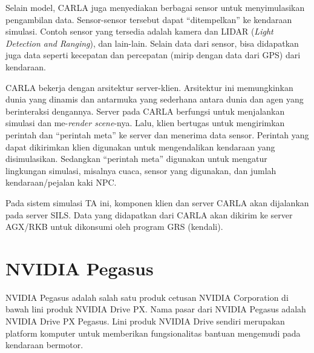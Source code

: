Selain model, CARLA juga menyediakan berbagai sensor untuk menyimulasikan
pengambilan data. Sensor-sensor tersebut dapat ``ditempelkan'' ke kendaraan
simulasi. Contoh sensor yang tersedia adalah kamera dan LIDAR (\textit{Light
    Detection and Ranging}), dan lain-lain. Selain data dari sensor, bisa didapatkan
juga data seperti kecepatan dan percepatan (mirip dengan data dari GPS) dari
kendaraan.

CARLA bekerja dengan arsitektur server-klien. Arsitektur ini memungkinkan dunia
yang dinamis dan antarmuka yang sederhana antara dunia dan agen yang
berinteraksi dengannya. Server pada CARLA berfungsi untuk menjalankan simulasi
dan me-\textit{render scene}-nya. Lalu, klien bertugas untuk mengirimkan
perintah dan ``perintah meta'' ke server dan menerima data sensor. Perintah yang
dapat dikirimkan klien digunakan untuk mengendalikan kendaraan yang
disimulasikan. Sedangkan ``perintah meta'' digunakan untuk mengatur lingkungan
simulasi, misalnya cuaca, sensor yang digunakan, dan jumlah kendaraan/pejalan
kaki NPC.

Pada sistem simulasi TA ini, komponen klien dan server CARLA akan dijalankan
pada server SILS. Data yang didapatkan dari CARLA akan dikirim ke server AGX/RKB
untuk dikonsumi oleh program GRS (kendali).

\section{NVIDIA Pegasus}

NVIDIA Pegasus adalah salah satu produk cetusan NVIDIA Corporation di bawah lini
produk NVIDIA Drive PX. Nama pasar dari NVIDIA Pegasus adalah N\-VI\-DI\-A Drive
PX Pegasus. Lini produk NVIDIA Drive sendiri merupakan platform komputer untuk
memberikan fungsionalitas bantuan mengemudi pada kendaraan bermotor.

